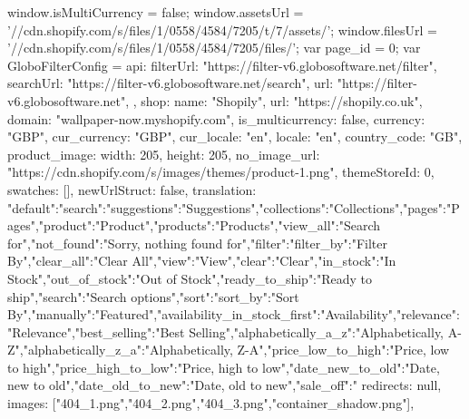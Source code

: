 {{  window.isMultiCurrency = false;
  window.assetsUrl = '//cdn.shopify.com/s/files/1/0558/4584/7205/t/7/assets/';
  window.filesUrl = '//cdn.shopify.com/s/files/1/0558/4584/7205/files/';
  var page_id = 0;
  var GloboFilterConfig = {
    api: {
      filterUrl: "https://filter-v6.globosoftware.net/filter",
      searchUrl: "https://filter-v6.globosoftware.net/search",
      url: "https://filter-v6.globosoftware.net",
    },
    shop: {
      name: "Shopily",
      url: "https://shopily.co.uk",
      domain: "wallpaper-now.myshopify.com",
      is_multicurrency: false,
      currency: "GBP",
      cur_currency: "GBP",
      cur_locale: "en",
      locale: "en",
      country_code: "GB",
      product_image: {width: 205, height: 205},
      no_image_url: "https://cdn.shopify.com/s/images/themes/product-1.png",
      themeStoreId: 0,
      swatches:  [],
      newUrlStruct: false,
      translation: {"default":{"search":{"suggestions":"Suggestions","collections":"Collections","pages":"Pages","product":"Product","products":"Products","view_all":"Search for","not_found":"Sorry, nothing found for"},"filter":{"filter_by":"Filter By","clear_all":"Clear All","view":"View","clear":"Clear","in_stock":"In Stock","out_of_stock":"Out of Stock","ready_to_ship":"Ready to ship","search":"Search options"},"sort":{"sort_by":"Sort By","manually":"Featured","availability_in_stock_first":"Availability","relevance":"Relevance","best_selling":"Best Selling","alphabetically_a_z":"Alphabetically, A-Z","alphabetically_z_a":"Alphabetically, Z-A","price_low_to_high":"Price, low to high","price_high_to_low":"Price, high to low","date_new_to_old":"Date, new to old","date_old_to_new":"Date, old to new","sale_off":"%
      redirects: null,
      images: ["404_1.png","404_2.png","404_3.png","container_shadow.png"],
}}}}}}}
